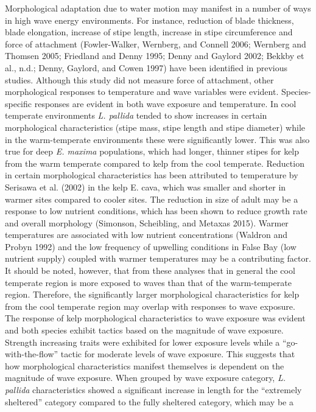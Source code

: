 \documentclass[
  a4paper,
]{article}
\begin{document}
Morphological adaptation due to water motion may manifest in a number of
ways in high wave energy environments. For instance, reduction of blade
thickness, blade elongation, increase of stipe length, increase in stipe
circumference and force of attachment (Fowler-Walker, Wernberg, and
Connell 2006; Wernberg and Thomsen 2005; Friedland and Denny 1995; Denny
and Gaylord 2002; Bekkby et al., n.d.; Denny, Gaylord, and Cowen 1997)
have been identified in previous studies. Although this study did not
measure force of attachment, other morphological responses to
temperature and wave variables were evident. Species-specific responses
are evident in both wave exposure and temperature. In cool temperate
environments \emph{L. pallida} tended to show increases in certain
morphological characteristics (stipe mass, stipe length and stipe
diameter) while in the warm-temperate environments these were
significantly lower. This was also true for deep \emph{E. maxima}
populations, which had longer, thinner stipes for kelp from the warm
temperate compared to kelp from the cool temperate. Reduction in certain
morphological characteristics has been attributed to temperature by
Serisawa et al. (2002) in the kelp E. cava, which was smaller and
shorter in warmer sites compared to cooler sites. The reduction in size
of adult may be a response to low nutrient conditions, which has been
shown to reduce growth rate and overall morphology (Simonson,
Scheibling, and Metaxas 2015). Warmer temperatures are associated with
low nutrient concentrations (Waldron and Probyn 1992) and the low
frequency of upwelling conditions in False Bay (low nutrient supply)
coupled with warmer temperatures may be a contributing factor. It should
be noted, however, that from these analyses that in general the cool
temperate region is more exposed to waves than that of the
warm-temperate region. Therefore, the significantly larger morphological
characteristics for kelp from the cool temperate region may overlap with
responses to wave exposure. The response of kelp morphological
characteristics to wave exposure was evident and both species exhibit
tactics based on the magnitude of wave exposure. Strength increasing
traits were exhibited for lower exposure levels while a
``go-with-the-flow'' tactic for moderate levels of wave exposure. This
suggests that how morphological characteristics manifest themselves is
dependent on the magnitude of wave exposure. When grouped by wave
exposure category, \emph{L. pallida} characteristics showed a
significant increase in length for the ``extremely sheltered'' category
compared to the fully sheltered category, which may be a
\end{document}
